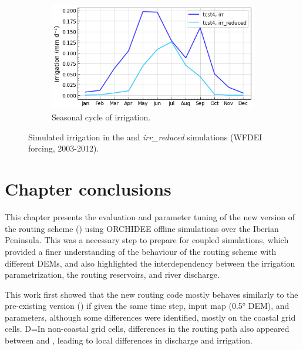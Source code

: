 \begin{figure}[htbp]
    \begin{subfigure}[b]{0.5\textwidth}        
        \caption{Seasonal cycle of irrigation.} 
        \includegraphics[width=\textwidth]{images/chap3/time_series/irrigation_seasonal_cycle_irr_reduced.png}
    \end{subfigure}
    \caption{Simulated irrigation in the \irr and \textit{irr\_reduced} simulations (WFDEI forcing, 2003-2012).}
    \label{fig:merit_irr_reduced}
\end{figure}

\pagebreak

\section{Chapter conclusions}

This chapter presents the evaluation and parameter tuning of the new version of the routing scheme (\native) using ORCHIDEE offline simulations over the Iberian Peninsula. This was a necessary step to prepare for coupled simulations, which provided a finer understanding of the behaviour of the routing scheme with different DEMs, and also highlighted the interdependency between the irrigation parametrization, the routing reservoirs, and river discharge. 

This work first showed that the new routing code mostly behaves similarly to the pre-existing version (\std) if given the same time step, input map (0.5° DEM), and parameters, although some differences were identified, mostly on the coastal grid cells. D=In non-coastal grid cells, differences in the routing path also appeared between \std and \native, leading to local differences in discharge and irrigation.

